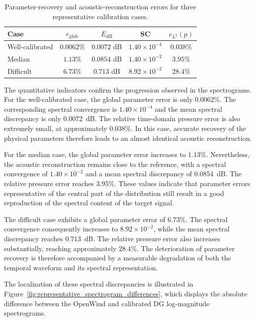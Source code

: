 \documentclass[11pt,a4paper]{report}
\theoremstyle{plain}
\theoremstyle{definition}
\begin{document}
\begin{table}[htbp]
\centering
\caption{
Parameter-recovery and acoustic-reconstruction errors for three representative
calibration cases.
}
\label{tab:representative_calibration_cases}
\begin{tabular}{lcccc}
\toprule
Case
& $e_{\mathrm{glob}}$
& $E_{\mathrm{dB}}$
& SC
& $e_{L^2}(p)$ \\
\midrule
Well-calibrated
& $0.0062\%$
& $0.0072$ dB
& $1.40\times10^{-4}$
& $0.038\%$ \\
Median
& $1.13\%$
& $0.0854$ dB
& $1.40\times10^{-2}$
& $3.95\%$ \\
Difficult
& $6.73\%$
& $0.713$ dB
& $8.92\times10^{-2}$
& $28.4\%$ \\
\bottomrule
\end{tabular}
\end{table}

The quantitative indicators confirm the progression observed in the
spectrograms. For the well-calibrated case, the global parameter error is only
$0.0062\%$. The corresponding spectral convergence is
$1.40\times10^{-4}$ and the mean spectral discrepancy is only
$0.0072$~dB. The relative time-domain pressure error is also extremely small,
at approximately $0.038\%$. In this case, accurate recovery of the physical
parameters therefore leads to an almost identical acoustic reconstruction.

For the median case, the global parameter error increases to $1.13\%$.
Nevertheless, the acoustic reconstruction remains close to the reference,
with a spectral convergence of $1.40\times10^{-2}$ and a mean spectral
discrepancy of $0.0854$~dB. The relative pressure error reaches $3.95\%$.
These values indicate that parameter errors representative of the central part
of the distribution still result in a good reproduction of the spectral
content of the target signal.

The difficult case exhibits a global parameter error of $6.73\%$. The
spectral convergence consequently increases to $8.92\times10^{-2}$, while
the mean spectral discrepancy reaches $0.713$~dB. The relative pressure error
also increases substantially, reaching approximately $28.4\%$. The
deterioration of parameter recovery is therefore accompanied by a measurable
degradation of both the temporal waveform and its spectral representation.

The localization of these spectral discrepancies is illustrated in
Figure~\ref{fig:representative_spectrogram_differences}, which displays the
absolute difference between the OpenWind and calibrated DG log-magnitude
spectrograms.
\end{document}
